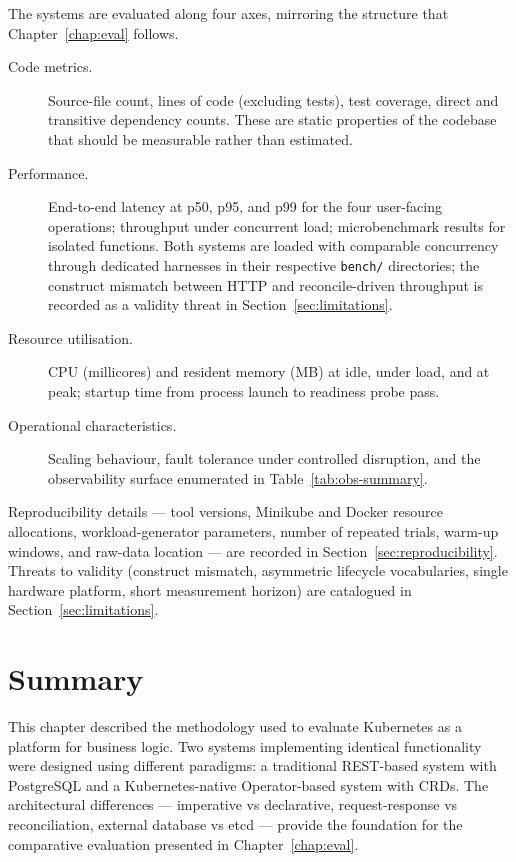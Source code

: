 The systems are evaluated along four axes, mirroring the structure that Chapter~\ref{chap:eval} follows.

\begin{description}
    \item[Code metrics.] Source-file count, lines of code (excluding tests), test coverage, direct and transitive dependency counts. These are static properties of the codebase that should be measurable rather than estimated.
    \item[Performance.] End-to-end latency at p50, p95, and p99 for the four user-facing operations; throughput under concurrent load; microbenchmark results for isolated functions. Both systems are loaded with comparable concurrency through dedicated harnesses in their respective \texttt{bench/} directories; the construct mismatch between HTTP and reconcile-driven throughput is recorded as a validity threat in Section~\ref{sec:limitations}.
    \item[Resource utilisation.] CPU (millicores) and resident memory (MB) at idle, under load, and at peak; startup time from process launch to readiness probe pass.
    \item[Operational characteristics.] Scaling behaviour, fault tolerance under controlled disruption, and the observability surface enumerated in Table~\ref{tab:obs-summary}.
\end{description}

Reproducibility details --- tool versions, Minikube and Docker resource allocations, workload-generator parameters, number of repeated trials, warm-up windows, and raw-data location --- are recorded in Section~\ref{sec:reproducibility}. Threats to validity (construct mismatch, asymmetric lifecycle vocabularies, single hardware platform, short measurement horizon) are catalogued in Section~\ref{sec:limitations}.

\section{Summary}

This chapter described the methodology used to evaluate Kubernetes as a platform for business logic. Two systems implementing identical functionality were designed using different paradigms: a traditional REST-based system with PostgreSQL and a Kubernetes-native Operator-based system with CRDs. The architectural differences --- imperative vs declarative, request-response vs reconciliation, external database vs etcd --- provide the foundation for the comparative evaluation presented in Chapter~\ref{chap:eval}.
